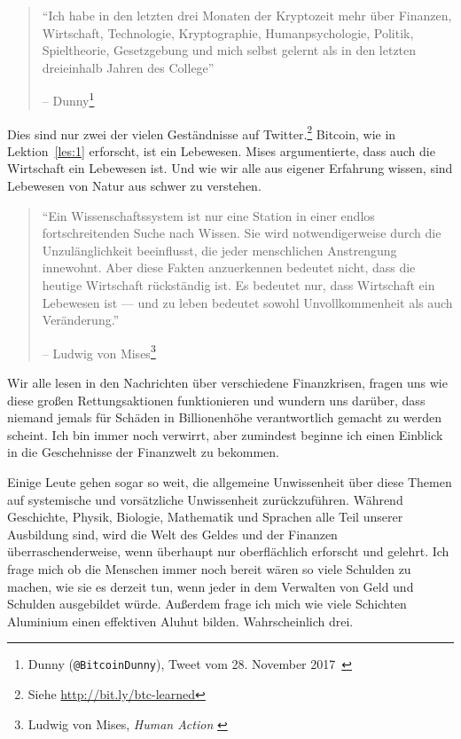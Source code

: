 \begin{quotation}\begin{samepage}
\enquote{Ich habe in den letzten drei Monaten der Kryptozeit mehr über Finanzen,
Wirtschaft, Technologie, Kryptographie, Humanpsychologie, Politik, Spieltheorie,
Gesetzgebung und mich selbst gelernt als in den letzten dreieinhalb Jahren des
College}
\begin{flushright} -- Dunny\footnote{Dunny (\texttt{@BitcoinDunny}), Tweet vom 28. November 2017~\cite{bitcoindunny-tweet}}
\end{flushright}\end{samepage}\end{quotation}

Dies sind nur zwei der vielen Geständnisse auf Twitter.\footnote{Siehe
\url{http://bit.ly/btc-learned}} Bitcoin, wie in Lektion~\ref{les:1} erforscht,
ist ein Lebewesen. Mises argumentierte, dass auch die Wirtschaft ein Lebewesen
ist. Und wie wir alle aus eigener Erfahrung wissen, sind Lebewesen von Natur aus
schwer zu verstehen.

\begin{quotation}\begin{samepage}
\enquote{Ein Wissenschaftssystem ist nur eine Station in einer endlos
fortschreitenden Suche nach Wissen. Sie wird notwendigerweise durch die
Unzulänglichkeit beeinflusst, die jeder menschlichen Anstrengung innewohnt. Aber
diese Fakten anzuerkennen bedeutet nicht, dass die heutige Wirtschaft
rückständig ist. Es bedeutet nur, dass Wirtschaft ein Lebewesen ist — und zu
leben bedeutet sowohl Unvollkommenheit als auch Veränderung.}
\begin{flushright} -- Ludwig von Mises\footnote{Ludwig von Mises, \textit{Human Action}
\cite{human-action}}
\end{flushright}\end{samepage}\end{quotation}

\newpage

Wir alle lesen in den Nachrichten über verschiedene Finanzkrisen, fragen uns wie
diese großen Rettungsaktionen funktionieren und wundern uns darüber, dass
niemand jemals für Schäden in Billionenhöhe verantwortlich gemacht zu werden
scheint. Ich bin immer noch verwirrt, aber zumindest beginne ich einen Einblick
in die Geschehnisse der Finanzwelt zu bekommen.

Einige Leute gehen sogar so weit, die allgemeine Unwissenheit über diese Themen
auf systemische und vorsätzliche Unwissenheit zurückzuführen. Während
Geschichte, Physik, Biologie, Mathematik und Sprachen alle Teil unserer
Ausbildung sind, wird die Welt des Geldes und der Finanzen überraschenderweise,
wenn überhaupt nur oberflächlich erforscht und gelehrt. Ich frage mich ob die
Menschen immer noch bereit wären so viele Schulden zu machen, wie sie es derzeit
tun, wenn jeder in dem Verwalten von Geld und Schulden ausgebildet würde.
Außerdem frage ich mich wie viele Schichten Aluminium einen effektiven Aluhut
bilden. Wahrscheinlich drei.

